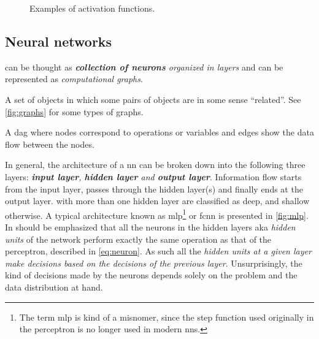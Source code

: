 \begin{figure}
	\centering
	\caption{Examples of activation functions.}
	\label{fig:activation_functions}
\end{figure}

\subsection{Neural networks}

 can be thought as \emph{\textbf{collection of neurons} organized
in layers} and can be represented as \emph{computational
graphs}.

\begin{definition}[Graph]
	A set of objects in which some pairs of objects are in some sense
	``related''. See \Figure{} \ref{fig:graphs} for some types of graphs.
\end{definition}

\begin{definition}
	A \gls{dag} where nodes correspond to operations or variables and edges show
	the data flow between the nodes.
\end{definition}

\noindent In general, the architecture of a
\gls{nn} can be broken down into the following three layers: \emph{\textbf{input
layer}, \textbf{hidden layer} and
\textbf{output layer}}. Information flow starts from the
input layer, passes through the hidden layer(s) and finally ends at the output
layer.  with more than one hidden layer are classified as deep, and
shallow otherwise. A typical architecture known as \gls{mlp}\footnote{The term \gls{mlp} is kind of a misnomer, since the step
function used originally in the perceptron is no longer used in modern
\glspl{nn}.} or \gls{fcnn} is presented in
\Figure{} \ref{fig:mlp}. In should be emphasized that all the neurons in the hidden
layers aka \emph{hidden units} of the network perform exactly
the same operation as that of the perceptron, described in \Equation{}
\ref{eq:neuron}. As such all the \emph{hidden units at a given layer make
decisions based on the decisions of the previous layer}. Unsurprisingly, the
kind of decisions made by the neurons depends solely on the problem and the data
distribution at hand.

